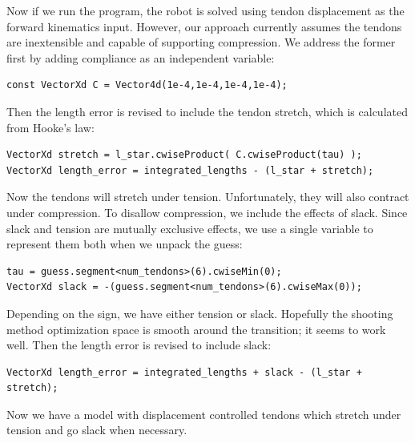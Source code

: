 \documentclass[12pt]{article}
\begin{document}
Now if we run the program, the robot is solved using tendon displacement as the forward kinematics input. However, our approach currently assumes the tendons are inextensible and capable of supporting compression. We address the former first by adding compliance as an independent variable:
\begin{lstlisting}
const VectorXd C = Vector4d(1e-4,1e-4,1e-4,1e-4);
\end{lstlisting}
Then the length error is revised to include the tendon stretch, which is calculated from Hooke's law:
\begin{lstlisting}
VectorXd stretch = l_star.cwiseProduct( C.cwiseProduct(tau) );
VectorXd length_error = integrated_lengths - (l_star + stretch);
\end{lstlisting}
Now the tendons will stretch under tension. Unfortunately, they will also contract under compression. 
To disallow compression, we include the effects of slack. Since slack and tension are mutually exclusive effects, we use a single variable to represent them both when we unpack the guess:
\begin{lstlisting}
tau = guess.segment<num_tendons>(6).cwiseMin(0);
VectorXd slack = -(guess.segment<num_tendons>(6).cwiseMax(0));
\end{lstlisting}
Depending on the sign, we have either tension or slack. Hopefully the shooting method optimization space is smooth around the transition; it seems to work well. Then the length error is revised to include slack:
\begin{lstlisting}
VectorXd length_error = integrated_lengths + slack - (l_star + stretch);
\end{lstlisting}
Now we have a model with displacement controlled tendons which stretch under tension and go slack when necessary.
\end{document}
